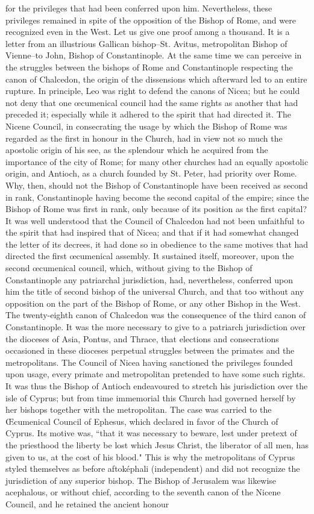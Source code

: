 for the privileges that had been conferred upon him. Nevertheless, these privileges remained in spite of the opposition of the Bishop of Rome, and were recognized even in the West. Let us give one proof among a thousand. It is a letter from an illustrious Gallican bishop--St. Avitus, metropolitan Bishop of Vienne--to John, Bishop of Constantinople. At the same time we can perceive in the struggles between the bishops of Rome and Constantinople respecting the canon of Chalcedon, the origin of the dissensions which afterward led to an entire rupture. In principle, Leo was right to defend the canons of Nicea; but he could not deny that one œcumenical council had the same rights as another that had preceded it; especially while it adhered to the spirit that had directed it. The Nicene Council, in consecrating the usage by which the Bishop of Rome was regarded as the first in honour in the Church, had in view not so much the apostolic origin of his see, as the splendour which he acquired from the importance of the city of Rome; for many other churches had an equally apostolic origin, and Antioch, as a church founded by St. Peter, had priority over Rome. Why, then, should not the Bishop of Constantinople have been received as second in rank, Constantinople having become the second capital of the empire; since the Bishop of Rome was first in rank, only because of its position as the first capital? It was well understood that the Council of Chalcedon had not been unfaithful to the spirit that had inspired that of Nicea; and that if it had somewhat changed the letter of its decrees, it had done so in obedience to the same motives that had directed the first œcumenical assembly. It sustained itself, moreover, upon the second œcumenical council, which, without giving to the Bishop of Constantinople any patriarchal jurisdiction, had, nevertheless, conferred upon him the title of second bishop of the universal Church, and that too without any opposition on the part of the Bishop of Rome, or any other Bishop in the West. The twenty-eighth canon of Chalcedon was the consequence of the third canon of Constantinople. It was the more necessary to give to a patriarch jurisdiction over the dioceses of Asia, Pontus, and Thrace, that elections and consecrations occasioned in these dioceses perpetual struggles between the primates and the metropolitans. The Council of Nicea having sanctioned the privileges founded upon usage, every primate and metropolitan pretended to have some such rights. It was thus the Bishop of Antioch endeavoured to stretch his jurisdiction over the isle of Cyprus; but from time immemorial this Church had governed herself by her bishops together with the metropolitan. The case was carried to the Œcumenical Council of Ephesus, which declared in favor of the Church of Cyprus. Its motive was, “that it was necessary to beware, lest under pretext of the priesthood the liberty be lost which Jesus Christ, the liberator of all men, has given to us, at the cost of his blood." This is why the metropolitans of Cyprus styled themselves as before aftoképhali (independent) and did not recognize the jurisdiction of any superior bishop. The Bishop of Jerusalem was likewise acephalous, or without chief, according to the seventh canon of the Nicene Council, and he retained the ancient honour 